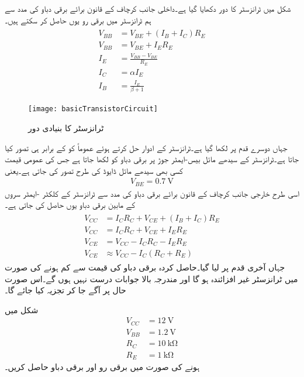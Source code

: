 

شکل  میں ٹرانزسٹر کا دور دکھایا گیا ہے۔داخلی جانب کرچاف کے قانون برائے برقی دباو کی مدد سے ہم ٹرانزسٹر میں برقی رو   یوں حاصل کر سکتے ہیں۔
\begin{gather} \label{مساوات_ٹرانزسٹر_کا_بنیادی_دور_داخلی_جانب}
\begin{aligned}
V_{BB} &=V_{BE} +(I_B+I_C) R_E\\
V_{BB}&=V_{BE}+I_E R_E\\
I_E& =\frac{V_{BB}-V_{BE}}{R_E}\\
I_C&=\alpha I_E \\
I_B&=\frac{I_E}{\beta+1}
\end{aligned}
\end{gather}
%
\begin{figure}
\centering
\texttt{[image: basicTransistorCircuit]}
\caption{ٹرانزسٹر کا بنیادی دور}
\label{شکل_ٹرانزسٹر_کا_بنیادی_دور}
\end{figure}
جہاں دوسرے قدم پر  لکھا گیا ہے۔ٹرانزسٹر کے ادوار حل کرتے ہوئے عموماً  کو  کے برابر ہی تصور کیا جاتا ہے۔ٹرانزسٹر کے سیدھے مائل بیس-ایمٹر  جوڑ پر برقی دباو کو   لکھا جاتا ہے جس کی عمومی قیمت کسی بھی سیدھے مائل ڈایوڈ کی طرح   تصور کی جاتی ہے۔یعنی
\begin{align}
V_{BE}=\SI{0.7}{\volt}
\end{align}
اسی طرح خارجی جانب کرچاف کے قانون برائے برقی دباو کی مدد سے ٹرانزسٹر کے کلکٹر -ایمٹر سروں کے مابین برقی دباو  یوں حاصل کی جاتی ہے۔
\begin{gather} \label{مساوات_ٹرانزسٹر_کا_بنیادی_دور_خارجی_جانب}
\begin{aligned}
V_{CC}&=I_C R_C + V_{CE}+(I_B+I_C)R_E\\
V_{CC}&=I_C R_C + V_{CE}+I_E R_E\\
V_{CE}&=V_{CC}-I_C R_C  - I_E R_E\\
V_{CE} & \approx V_{CC}-I_C(R_C+R_E)
\end{aligned}
\end{gather}
جہاں آخری قدم پر  لیا گیا۔حاصل کردہ برقی دباو  کی قیمت  سے کم ہونے کی صورت میں ٹرانزسٹر غیر افزائندہ ہو گا اور مندرجہ بالا جوابات درست نہیں ہوں گے۔اس صورت حال پر آگے جا کر تجزیہ کیا جائے گا۔


شکل   میں 
\begin{align*}
V_{CC}&=\SI{12}{\volt} \\
V_{BB}&=\SI{1.2}{\volt} \\
R_C& = \SI{10}{\kilo \ohm}\\
R_E&=\SI{1}{\kilo \ohm}
\end{align*}
ہونے کی صورت میں برقی رو  اور برقی دباو  حاصل کریں۔


